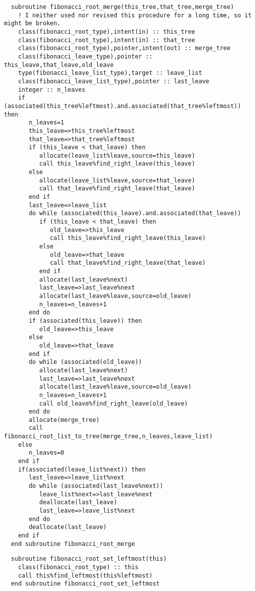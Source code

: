 \begin{Verbatim}
  subroutine fibonacci_root_merge(this_tree,that_tree,merge_tree)
    ! I neither used nor revised this procedure for a long time, so it might be broken.
    class(fibonacci_root_type),intent(in) :: this_tree
    class(fibonacci_root_type),intent(in) :: that_tree
    class(fibonacci_root_type),pointer,intent(out) :: merge_tree
    class(fibonacci_leave_type),pointer :: this_leave,that_leave,old_leave
    type(fibonacci_leave_list_type),target :: leave_list
    class(fibonacci_leave_list_type),pointer :: last_leave
    integer :: n_leaves
    if (associated(this_tree%leftmost).and.associated(that_tree%leftmost)) then
       n_leaves=1
       this_leave=>this_tree%leftmost
       that_leave=>that_tree%leftmost
       if (this_leave < that_leave) then
          allocate(leave_list%leave,source=this_leave)
          call this_leave%find_right_leave(this_leave)
       else
          allocate(leave_list%leave,source=that_leave)
          call that_leave%find_right_leave(that_leave)
       end if
       last_leave=>leave_list
       do while (associated(this_leave).and.associated(that_leave))
          if (this_leave < that_leave) then
             old_leave=>this_leave
             call this_leave%find_right_leave(this_leave)
          else
             old_leave=>that_leave
             call that_leave%find_right_leave(that_leave)
          end if
          allocate(last_leave%next)
          last_leave=>last_leave%next
          allocate(last_leave%leave,source=old_leave)
          n_leaves=n_leaves+1
       end do
       if (associated(this_leave)) then
          old_leave=>this_leave
       else
          old_leave=>that_leave
       end if
       do while (associated(old_leave))
          allocate(last_leave%next)
          last_leave=>last_leave%next
          allocate(last_leave%leave,source=old_leave)
          n_leaves=n_leaves+1
          call old_leave%find_right_leave(old_leave)
       end do
       allocate(merge_tree)
       call fibonacci_root_list_to_tree(merge_tree,n_leaves,leave_list)
    else
       n_leaves=0
    end if
    if(associated(leave_list%next)) then
       last_leave=>leave_list%next
       do while (associated(last_leave%next))
          leave_list%next=>last_leave%next
          deallocate(last_leave)
          last_leave=>leave_list%next
       end do
       deallocate(last_leave)
    end if
  end subroutine fibonacci_root_merge
\end{Verbatim}

\begin{Verbatim}
  subroutine fibonacci_root_set_leftmost(this)
    class(fibonacci_root_type) :: this
    call this%find_leftmost(this%leftmost)
  end subroutine fibonacci_root_set_leftmost
\end{Verbatim}

